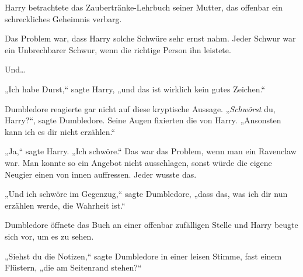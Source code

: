 Harry betrachtete das Zaubertränke-Lehrbuch seiner Mutter, das offenbar ein schreckliches Geheimnis verbarg.

Das Problem war, dass Harry solche Schwüre sehr ernst nahm. Jeder Schwur war ein Unbrechbarer Schwur, wenn die richtige Person ihn leistete.

Und…

„Ich habe Durst,“ sagte Harry, „und das ist wirklich kein gutes Zeichen.“

Dumbledore reagierte gar nicht auf diese kryptische Aussage. „\emph{Schwörst} du, Harry?“, sagte Dumbledore. Seine Augen fixierten die von Harry. „Ansonsten kann ich es dir nicht erzählen.“

„Ja,“ sagte Harry. „Ich schwöre.“ Das war das Problem, wenn man ein Ravenclaw war. Man konnte so ein Angebot nicht ausschlagen, sonst würde die eigene Neugier einen von innen auffressen. Jeder wusste das.

„Und ich schwöre im Gegenzug,“ sagte Dumbledore, „dass das, was ich dir nun erzählen werde, die Wahrheit ist.“

Dumbledore öffnete das Buch an einer offenbar zufälligen Stelle und Harry beugte sich vor, um es zu sehen.

„Siehst du die Notizen,“ sagte Dumbledore in einer leisen Stimme, fast einem Flüstern, „die am Seitenrand stehen?“

